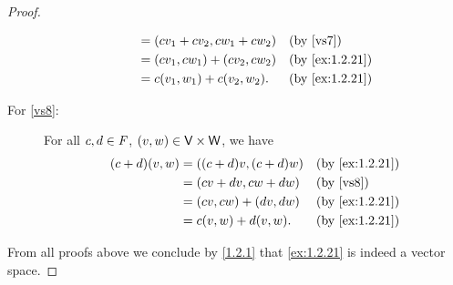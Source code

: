 \begin{proof}
\begin{description}
\begin{align*}
				                                          & = \p{cv_{1} + cv_{2}, cw_{1} + cw_{2}}      &  & \text{(by \ref{vs7})}        \\
				                                          & = \p{cv_{1}, cw_{1}} + \p{cv_{2}, cw_{2}}   &  & \text{(by \cref{ex:1.2.21})} \\
				                                          & = c\p{v_{1}, w_{1}} + c\p{v_{2}, w_{2}}.    &  & \text{(by \cref{ex:1.2.21})}
			\end{align*}
		\item[For \ref{vs8}:]
			For all \(c, d \in \mathit{F}\), \(\left\lparen v, w\right\rparen \in \mathsf{V} \times \mathsf{W}\), we have
			\begin{align*}
				\p{c + d} \p{v, w} & = \p{\p{c + d} v, \p{c + d} w} &  & \text{(by \cref{ex:1.2.21})} \\
				                   & = \p{cv + dv, cw + dw}         &  & \text{(by \ref{vs8})}        \\
				                   & = \p{cv, cw} + \p{dv, dw}      &  & \text{(by \cref{ex:1.2.21})} \\
				                   & = c\p{v, w} + d\p{v, w}.       &  & \text{(by \cref{ex:1.2.21})}
			\end{align*}
	\end{description}
	From all proofs above we conclude by \cref{1.2.1} that \cref{ex:1.2.21} is indeed a vector space.
\end{proof}
